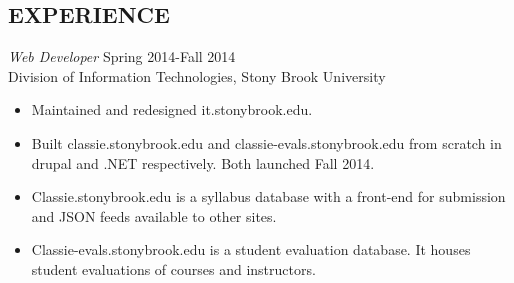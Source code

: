 \documentclass[margin]{res}
\begin{document}
\begin{resume}
 
\section{EXPERIENCE}
                {\sl Web Developer} \hfill    Spring 2014-Fall 2014 \\
                Division of Information Technologies, Stony Brook University
                \begin{itemize} \itemsep -2pt
                \item Maintained and redesigned it.stonybrook.edu.
                \item Built classie.stonybrook.edu and classie-evals.stonybrook.edu from scratch in drupal and .NET respectively. Both launched Fall 2014.
                \item Classie.stonybrook.edu is a syllabus database with a front-end for submission and JSON feeds available to other sites.
                \item Classie-evals.stonybrook.edu is a student evaluation database. It houses student evaluations of courses and instructors.
			  \end{itemize}

 


\end{resume}
\end{document}
